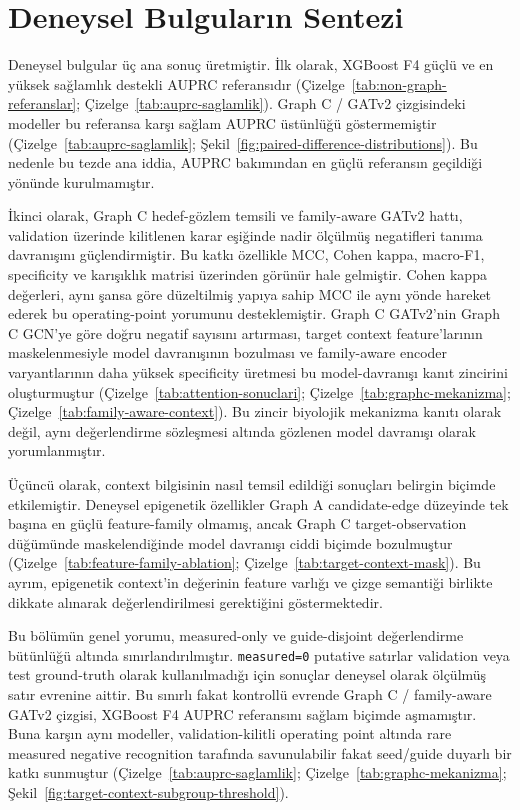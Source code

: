 \section{Deneysel Bulguların Sentezi}

Deneysel bulgular üç ana sonuç üretmiştir. İlk olarak, XGBoost F4 güçlü ve en yüksek sağlamlık destekli AUPRC referansıdır (Çizelge~\ref{tab:non-graph-referanslar}; Çizelge~\ref{tab:auprc-saglamlik}). Graph C / GATv2 çizgisindeki modeller bu referansa karşı sağlam AUPRC üstünlüğü göstermemiştir (Çizelge~\ref{tab:auprc-saglamlik}; Şekil~\ref{fig:paired-difference-distributions}). Bu nedenle bu tezde ana iddia, AUPRC bakımından en güçlü referansın geçildiği yönünde kurulmamıştır.

İkinci olarak, Graph C hedef-gözlem temsili ve family-aware GATv2 hattı, validation üzerinde kilitlenen karar eşiğinde nadir ölçülmüş negatifleri tanıma davranışını güçlendirmiştir. Bu katkı özellikle MCC, Cohen kappa, macro-F1, specificity ve karışıklık matrisi üzerinden görünür hale gelmiştir. Cohen kappa değerleri, aynı şansa göre düzeltilmiş yapıya sahip MCC ile aynı yönde hareket ederek bu operating-point yorumunu desteklemiştir. Graph C GATv2'nin Graph C GCN'ye göre doğru negatif sayısını artırması, target context feature'larının maskelenmesiyle model davranışının bozulması ve family-aware encoder varyantlarının daha yüksek specificity üretmesi bu model-davranışı kanıt zincirini oluşturmuştur (Çizelge~\ref{tab:attention-sonuclari}; Çizelge~\ref{tab:graphc-mekanizma}; Çizelge~\ref{tab:family-aware-context}). Bu zincir biyolojik mekanizma kanıtı olarak değil, aynı değerlendirme sözleşmesi altında gözlenen model davranışı olarak yorumlanmıştır.

Üçüncü olarak, context bilgisinin nasıl temsil edildiği sonuçları belirgin biçimde etkilemiştir. Deneysel epigenetik özellikler Graph A candidate-edge düzeyinde tek başına en güçlü feature-family olmamış, ancak Graph C target-observation düğümünde maskelendiğinde model davranışı ciddi biçimde bozulmuştur (Çizelge~\ref{tab:feature-family-ablation}; Çizelge~\ref{tab:target-context-mask}). Bu ayrım, epigenetik context'in değerinin feature varlığı ve çizge semantiği birlikte dikkate alınarak değerlendirilmesi gerektiğini göstermektedir.

Bu bölümün genel yorumu, measured-only ve guide-disjoint değerlendirme bütünlüğü altında sınırlandırılmıştır. \texttt{measured=0} putative satırlar validation veya test ground-truth olarak kullanılmadığı için sonuçlar deneysel olarak ölçülmüş satır evrenine aittir. Bu sınırlı fakat kontrollü evrende Graph C / family-aware GATv2 çizgisi, XGBoost F4 AUPRC referansını sağlam biçimde aşmamıştır. Buna karşın aynı modeller, validation-kilitli operating point altında rare measured negative recognition tarafında savunulabilir fakat seed/guide duyarlı bir katkı sunmuştur (Çizelge~\ref{tab:auprc-saglamlik}; Çizelge~\ref{tab:graphc-mekanizma}; Şekil~\ref{fig:target-context-subgroup-threshold}).
